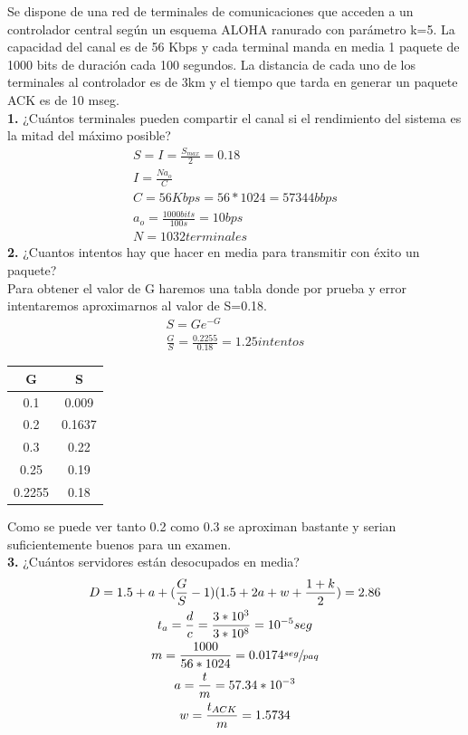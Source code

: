 \begin{exercise}[4]
Se dispone de una red de terminales de comunicaciones que acceden a un controlador central según un esquema ALOHA ranurado con parámetro k=5. La capacidad del canal es de 56 Kbps y cada terminal manda en media 1 paquete de 1000 bits de duración cada 100 segundos. La distancia de cada uno de los terminales al controlador es de 3km y el tiempo que tarda en generar un paquete ACK es de 10 mseg.\\
\textbf{1.} ¿Cuántos terminales pueden compartir el canal si el rendimiento del sistema es la mitad del máximo posible?\\
\begin{gather*}
S=I=\frac{S_{max}}{2}=0.18\\
I=\frac{Na_o}{C}\\
C=56Kbps=56*1024=57344bbps\\
a_o=\frac{1000bits}{100s}=10bps\\
N=1032terminales
\end{gather*}
\textbf{2.} ¿Cuantos intentos hay que hacer en media para transmitir con éxito un paquete?\\
Para obtener el valor de G haremos una tabla donde por prueba y error intentaremos aproximarnos al valor de S=0.18.
\begin{gather*}
S=Ge^{-G}\\
\frac{G}{S}=\frac{0.2255}{0.18}=1.25 intentos
\end{gather*}
\begin{center}
\begin{tabular}{c | c}
G & S \\\hline
0.1 & 0.009\\
0.2 & 0.1637\\
0.3 & 0.22\\
0.25 & 0.19\\
0.2255 & 0.18\\
\end{tabular}
\end{center}
Como se puede ver tanto 0.2 como 0.3 se aproximan bastante y serian suficientemente buenos para un examen.\\
\textbf{3.} ¿Cuántos servidores están desocupados en media?\\
\begin{gather*}
D=1.5+a+(\frac{G}{S}-1)(1.5+2a+w+\frac{1+k}{2})=2.86\\
t_a=\frac{d}{c}=\frac{3*10^3}{3*10^8}=10^{-5}seg\\
m=\frac{1000}{56*1024}=0.0174\sfrac{seg}{paq}\\
a=\frac{t}{m}=57.34*10^{-3}\\
w=\frac{t_{ACK}}{m}=1.5734
\end{gather*}
\end{exercise}
